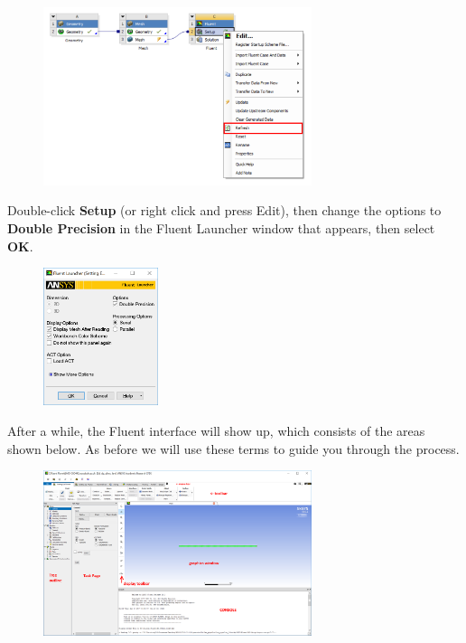\documentclass[11pt,a4paper,oneside,hidelinks]{scrartcl}
\newcommand\bfr[1]{\textcolor[rgb]{1,0.00,0.00}{\textbf{\textsf{#1}}}}
\begin{document}
\begin{figure}[H]
\begin{center}
\includegraphics[width=0.7\textwidth,clip]{fluent_workbench_refresh.png}
\end{center}
\end{figure}
Double-click \bfr{Setup} (or right click and press Edit), then change the options to \bfr{Double Precision} in the Fluent Launcher window that appears, then select \bfr{OK}.
\begin{figure}[H]
\begin{center}
\includegraphics[width=0.3\textwidth,clip]{fluent_launcher.png}
\end{center}
\end{figure}
After a while, the Fluent interface will show up, which consists of the areas shown below. As before we will use these terms to guide you through the process.
\begin{figure}[H]
\begin{center}
\includegraphics[width=0.7\textwidth,clip]{Fluent_GUI.png}
\end{center}
\end{figure}
\end{document}
